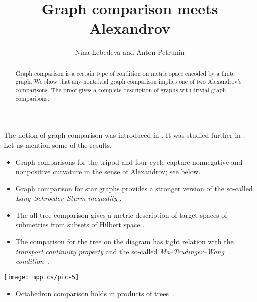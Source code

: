 \documentclass{article}
\def\thetitle{Graph comparison meets Alexandrov}
\def\theauthors{Nina Lebedeva and Anton Petrunin}
\def\parbf#1{\medskip\noindent{\bf #1}}
\begin{document}


\title{\thetitle}
\author{\theauthors}

\date{}
\maketitle
\begin{abstract}
Graph comparison is a certain type of condition on metric space encoded by a finite graph.
We show that any nontrivial graph comparison implies one of two Alexandrov's comparisons.
The proof gives a complete description of graphs with trivial graph comparisons.
\end{abstract}

\parbf{Preface.}
The notion of graph comparison was introduced in \cite{lebedeva-petrunin-zolotov}.
It was studied further in \cite{toyoda,toyoda2019,lebedeva-petrunin-CBB,lebedeva,lebedeva-petrunin,lebedeva-petrunin-octahedron}.
Let us mention some of the results.
\begin{itemize}
\item Graph comparisons for the tripod and four-cycle capture nonnegative and nonpositive curvature in the sense of Alexandrov; see below.
\end{itemize}
\begin{itemize}
\item Graph comparison for star graphs provides a stronger version of the so-called \emph{Lang--Schroeder--Sturm inequality} \cite{lang-schroeder, sturm, lebedeva-petrunin-CBB}.
\end{itemize}
\begin{itemize}
\item The all-tree comparison gives a metric description of target spaces of submetries from subsets of Hilbert space \cite{lebedeva-petrunin-zolotov}.
\end{itemize}

\noindent
\begin{minipage}
{.80\textwidth}
\begin{itemize}
\item The comparison for the tree on the diagram has tight relation with the \emph{transport continuity property} and the so-called \emph{Ma--Trudinger--Wang condition}~\cite{lebedeva-petrunin-zolotov,ma-trudinger-wang}.
\end{itemize}
\end{minipage}
\hfill
\begin{minipage}{.17\textwidth}
\centering
\vskip-1mm
\texttt{[image: mppics/pic-5]}
\end{minipage}
\begin{itemize}
\item Octahedron comparison holds in products of trees~\cite{lebedeva-petrunin-octahedron}.
\end{itemize}
\end{document}
